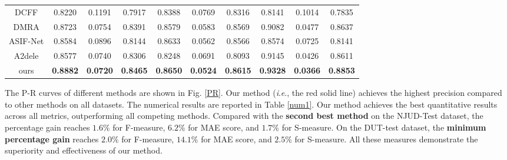 \documentclass[runningheads]{llncs}
\newcommand{\ie}{\textit{i}.\textit{e}.}
\begin{document}
\begin{table*}[t]
\begin{center}
\begin{tabular}{|c|c|c|c||c|c|c||c|c|c|}
			DCFF \cite{DCFF}  & 0.8220 & 0.1191 & 0.7917 & 0.8388 & 0.0769 & 0.8316 & 0.8141 & 0.1014 & 0.7835 \\
			
			DMRA \cite{DMRA} & 0.8723 & 0.0754 & 0.8391 & 0.8579 & 0.0583 & 0.8569 & 0.9082 & 0.0477 & 0.8637 \\
			
			ASIF-Net \cite{ASIF-Net} & 0.8584 & 0.0896 & 0.8144 & 0.8633  & 0.0562 & 0.8566 & 0.8574  &0.0725  &  0.8141  \\
			
			A2dele \cite{A2dele} & 0.8577 & 0.0740 & 0.8306 & 0.8248 & 0.0691 & 0.8093 & 0.9145 & 0.0426 & 0.8611  \\
			
			ours  & \textbf{0.8882} & \textbf{0.0720} & \textbf{0.8465} & \textbf{0.8650} & \textbf{0.0524} & \textbf{0.8615} & \textbf{0.9328} & \textbf{0.0366} & \textbf{0.8853} \\
			\hline
		\end{tabular}
	\end{center}
	\label{num1}
\end{table*}



The P-R curves of different methods are shown in Fig. \ref{PR}. Our method (\ie, the red solid line) achieves the highest precision compared to other methods on all datasets. The numerical results are reported in Table \ref{num1}. Our method achieves the best quantitative results across all metrics, outperforming all competing methods.  Compared with the \textbf{second best method} on the NJUD-Test dataset, the percentage gain reaches $1.6\%$ for F-measure, $6.2\%$ for MAE score, and $1.7\%$ for S-measure. On the DUT-test dataset, the \textbf{minimum percentage gain} reaches $2.0\%$ for F-measure, $14.1\%$ for MAE score, and $2.5\%$ for S-measure. All these measures demonstrate the superiority and effectiveness of our method.
\end{document}
